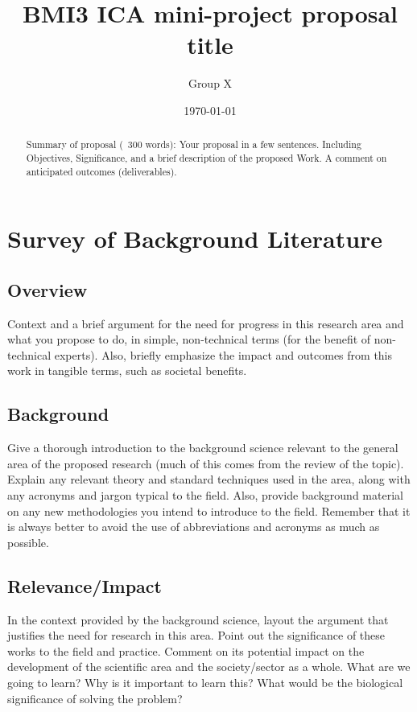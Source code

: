 \documentclass{IEEEtran}
\title{BMI3 ICA mini-project proposal title}
\author{Group X}
\date{\today}
\begin{document}
\maketitle
\begin{abstract}
    Summary of proposal (~300 words): Your proposal in a few sentences. Including Objectives, Significance, and a brief description of the proposed Work. A comment on anticipated outcomes (deliverables).
\end{abstract}

\section{Survey of Background Literature}

\subsection{Overview}

 Context and a brief argument for the need for progress in this research area and what you propose to do, in simple, non-technical terms (for the benefit of non-technical experts). Also, briefly emphasize the impact and outcomes from this work in tangible terms, such as societal benefits.

\subsection{Background}

Give a thorough introduction to the background science relevant to the general area of the proposed research (much of this comes from the review of the topic). Explain any relevant theory and standard techniques used in the area, along with any acronyms and jargon typical to the field. Also, provide background material on any new methodologies you intend to introduce to the field. Remember that it is always better to avoid the use of abbreviations and acronyms as much as possible.

\subsection{Relevance/Impact}

In the context provided by the background science, layout the argument that justifies the need for research in this area. Point out the significance of these works to the field and practice. Comment on its potential impact on the development of the scientific area and the society/sector as a whole. What are we going to learn? Why is it important to learn this? What would be the biological significance of solving the problem?
\end{document}
